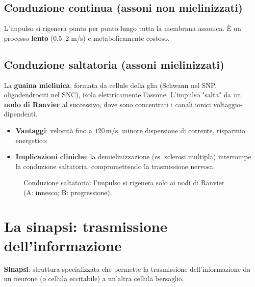 \documentclass[11pt,a4paper,italian,twoside]{report}
\theoremstyle{definition} %
\begin{document}
\subsection{Conduzione continua (assoni non mielinizzati)}
\label{subsec:continua}
L'impulso si rigenera punto per punto lungo tutta la membrana assonica. È un processo \textbf{lento} (0.5–2 m/s) e metabolicamente costoso.

\subsection{Conduzione saltatoria (assoni mielinizzati)}
\label{subsec:saltatoria}

\begin{concetto}
La \textbf{guaina mielinica}, formata da cellule della glia (Schwann nel SNP, oligodendrociti nel SNC), isola elettricamente l'assone. L'impulso "salta" da un \textbf{nodo di Ranvier} al successivo, dove sono concentrati i canali ionici voltaggio-dipendenti.
\end{concetto}

\begin{itemize}
  \item \textbf{Vantaggi}: velocità fino a \(120\,\mathrm{m/s}\), minore dispersione di corrente, risparmio energetico;
  \item \textbf{Implicazioni cliniche}: la demielinizzazione (es. sclerosi multipla) interrompe la conduzione saltatoria, compromettendo la trasmissione nervosa.
\end{itemize}

\begin{figure}[htbp]
  \centering
  \caption{Conduzione saltatoria: l'impulso si rigenera solo ai nodi di Ranvier (A: innesco; B: progressione).}
  \label{fig:saltatoria}
\end{figure}

\section{La sinapsi: trasmissione dell'informazione}
\label{sec:sinapsi_intro}

\begin{definizione}
\textbf{Sinapsi}: struttura specializzata che permette la trasmissione dell'informazione da un neurone (o cellula eccitabile) a un'altra cellula bersaglio.
\end{definizione}
\end{document}
